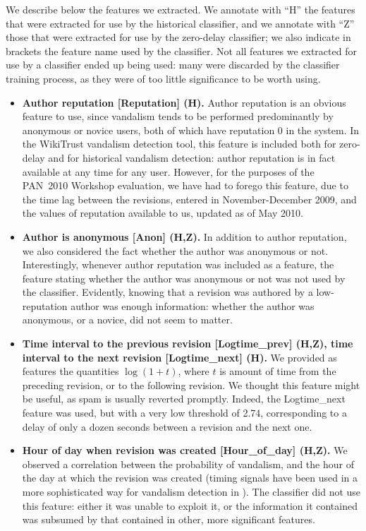 We describe below the features we extracted. 
We annotate with ``H'' the features that were extracted for use by the historical classifier, and we annotate with ``Z'' those that were extracted for use by the zero-delay classifier; we also indicate in brackets the feature name used by the classifier. 
Not all features we extracted for use by a classifier ended up being used: many were discarded by the classifier training process, as they were of too little significance to be worth using.
%
\begin{itemize}

\item {\bf Author reputation [Reputation] (H).}  Author reputation is an obvious feature to use, since vandalism tends to be performed predominantly by anonymous or novice users, both of which have reputation 0 in the system.  
In the WikiTrust vandalism detection tool, this feature is included both for zero-delay and for historical vandalism detection: author reputation is in fact available at any time for any user. 
However, for the purposes of the PAN~2010 Workshop evaluation, we have had to forego this feature, due to the time lag between the revisions, entered in November-December 2009, and the values of reputation available to us, updated as of May 2010. 

\item {\bf Author is anonymous [Anon] (H,Z).}  In addition to author reputation, we also considered the fact whether the author was anonymous or not. 
Interestingly, whenever author reputation was included as a feature, the feature stating whether the author was anonymous or not was not used by the classifier.
Evidently, knowing that a revision was authored by a low-reputation author was enough information: whether the author was anonymous, or a novice, did not seem to matter.

\item {\bf Time interval to the previous revision [Logtime\_prev] (H,Z), time interval to the next revision [Logtime\_next] (H).}
We provided as features the quantities $\log(1 + t)$, where $t$ is amount of time from the preceding revision, or to the following revision. 
We thought this feature might be useful, as spam is usually reverted promptly.
Indeed, the Logtime\_next feature was used, but with a very low threshold of 2.74, corresponding to a delay of only a dozen seconds between a revision and the next one. 

\item {\bf Hour of day when revision was created [Hour\_of\_day] (H,Z).}
We observed a correlation between the probability of vandalism, and the hour of the day at which the revision was created (timing signals have been used in a more sophisticated way for vandalism detection in \cite{West2010}).  The classifier did not use this feature: either it was unable to exploit it, or the information it contained was subsumed by that contained in other, more significant features.


\end{itemize}
